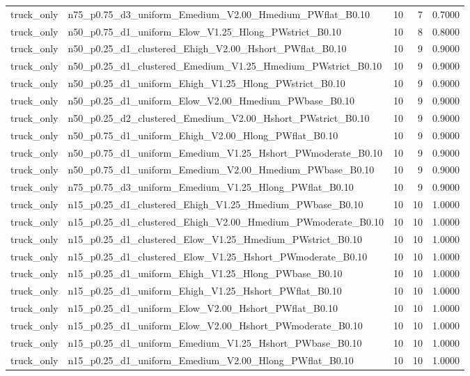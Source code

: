 \begin{tabular}{llrrr}
truck_only & n75_p0.75_d3_uniform_Emedium_V2.00_Hmedium_PWflat_B0.10 & 10 & 7 & 0.7000 \\
truck_only & n50_p0.75_d1_uniform_Elow_V1.25_Hlong_PWstrict_B0.10 & 10 & 8 & 0.8000 \\
truck_only & n50_p0.25_d1_clustered_Ehigh_V2.00_Hshort_PWflat_B0.10 & 10 & 9 & 0.9000 \\
truck_only & n50_p0.25_d1_clustered_Emedium_V1.25_Hmedium_PWstrict_B0.10 & 10 & 9 & 0.9000 \\
truck_only & n50_p0.25_d1_uniform_Ehigh_V1.25_Hlong_PWstrict_B0.10 & 10 & 9 & 0.9000 \\
truck_only & n50_p0.25_d1_uniform_Elow_V2.00_Hmedium_PWbase_B0.10 & 10 & 9 & 0.9000 \\
truck_only & n50_p0.25_d2_clustered_Emedium_V2.00_Hshort_PWstrict_B0.10 & 10 & 9 & 0.9000 \\
truck_only & n50_p0.75_d1_uniform_Ehigh_V2.00_Hlong_PWflat_B0.10 & 10 & 9 & 0.9000 \\
truck_only & n50_p0.75_d1_uniform_Emedium_V1.25_Hshort_PWmoderate_B0.10 & 10 & 9 & 0.9000 \\
truck_only & n50_p0.75_d1_uniform_Emedium_V2.00_Hmedium_PWbase_B0.10 & 10 & 9 & 0.9000 \\
truck_only & n75_p0.75_d3_uniform_Emedium_V1.25_Hlong_PWflat_B0.10 & 10 & 9 & 0.9000 \\
truck_only & n15_p0.25_d1_clustered_Ehigh_V1.25_Hmedium_PWbase_B0.10 & 10 & 10 & 1.0000 \\
truck_only & n15_p0.25_d1_clustered_Ehigh_V2.00_Hmedium_PWmoderate_B0.10 & 10 & 10 & 1.0000 \\
truck_only & n15_p0.25_d1_clustered_Elow_V1.25_Hmedium_PWstrict_B0.10 & 10 & 10 & 1.0000 \\
truck_only & n15_p0.25_d1_clustered_Elow_V1.25_Hshort_PWmoderate_B0.10 & 10 & 10 & 1.0000 \\
truck_only & n15_p0.25_d1_uniform_Ehigh_V1.25_Hlong_PWbase_B0.10 & 10 & 10 & 1.0000 \\
truck_only & n15_p0.25_d1_uniform_Ehigh_V1.25_Hshort_PWflat_B0.10 & 10 & 10 & 1.0000 \\
truck_only & n15_p0.25_d1_uniform_Elow_V2.00_Hshort_PWflat_B0.10 & 10 & 10 & 1.0000 \\
truck_only & n15_p0.25_d1_uniform_Elow_V2.00_Hshort_PWmoderate_B0.10 & 10 & 10 & 1.0000 \\
truck_only & n15_p0.25_d1_uniform_Emedium_V1.25_Hshort_PWbase_B0.10 & 10 & 10 & 1.0000 \\
truck_only & n15_p0.25_d1_uniform_Emedium_V2.00_Hlong_PWflat_B0.10 & 10 & 10 & 1.0000 \\

\end{tabular}
